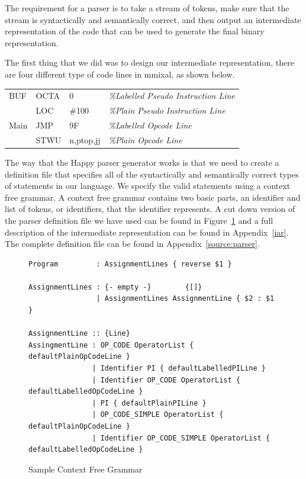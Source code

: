 \documentclass[a4paper,11pt]{report}
\begin{document}
The requirement for a parser is to take a stream of tokens, make sure that the stream is syntactically and semantically correct, and then output an intermediate representation of the code that can be used to generate the final binary representation.

The first thing that we did was to design our intermediate representation, there are four different type of code lines in mmixal, as shown below.

\begin{centering}
\begin{tabular}{ l l l l }
BUF & OCTA & 0 & \textit{\%Labelled Pseudo Instruction Line}\\
 & LOC & \#100 & \textit{\%Plain Pseudo Instruction Line}\\
Main & JMP & 9F & \textit{\%Labelled Opcode Line}\\
 & STWU & n,ptop,jj & \textit{\%Plain Opcode Line}\\
\end{tabular}
\end{centering}

The way that the Happy parser generator works is that we need to create a definition file that specifies all of the syntactically and semantically correct types of statements in our language. We specify the valid statements using a context free grammar. A context free grammar contains two basic parts, an identifier and list of tokens, or identifiers, that the identifier represents. A cut down version of the parser definition file we have used can be found in Figure~\ref{cfg:happy} and a full description of the intermediate representation can be found in Appendix~\ref{iar}. 
The complete definition file can be found in Appendix~\ref{source:parser}.

\begin{figure}[ht!]
\centering
\begin{lstlisting}[basicstyle=\ttfamily\tiny]
Program         : AssignmentLines { reverse $1 }

AssignmentLines : {- empty -}        {[]}
                | AssignmentLines AssignmentLine { $2 : $1 }

AssignmentLine :: {Line}
AssingmentLine : OP_CODE OperatorList { defaultPlainOpCodeLine }
               | Identifier PI { defaultLabelledPILine }
               | Identifier OP_CODE OperatorList { defaultLabelledOpCodeLine }
               | PI { defaultPlainPILine }
               | OP_CODE_SIMPLE OperatorList { defaultPlainOpCodeLine }
               | Identifier OP_CODE_SIMPLE OperatorList { defaultLabelledOpCodeLine }
\end{lstlisting}
\caption{Sample Context Free Grammar}
\label{cfg:happy}
\end{figure}
\end{document}
